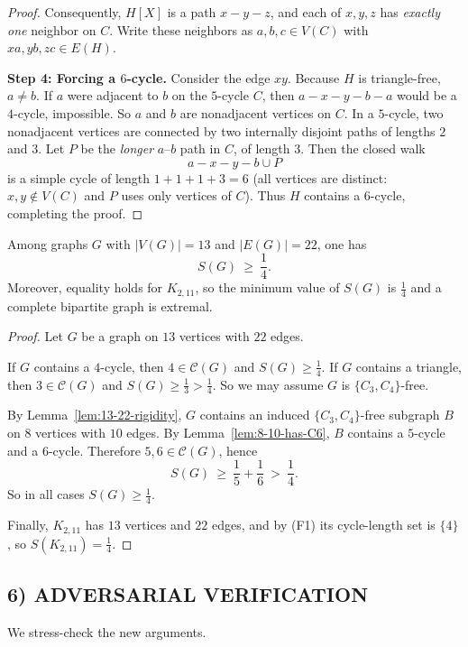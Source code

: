 \begin{proof}
Consequently, $H[X]$ is a path $x-y-z$, and each of $x,y,z$ has \emph{exactly one} neighbor on $C$.
Write these neighbors as $a,b,c\in V(C)$ with $xa, yb, zc\in E(H)$.

\medskip
\noindent\textbf{Step 4: Forcing a $6$-cycle.}
Consider the edge $xy$.
Because $H$ is triangle-free, $a\neq b$.
If $a$ were adjacent to $b$ on the $5$-cycle $C$, then $a-x-y-b-a$ would be a $4$-cycle, impossible.
So $a$ and $b$ are nonadjacent vertices on $C$.
In a $5$-cycle, two nonadjacent vertices are connected by two internally disjoint paths of lengths $2$ and $3$.
Let $P$ be the \emph{longer} $a$--$b$ path in $C$, of length $3$.
Then the closed walk
\[
a-x-y-b \cup P
\]
is a simple cycle of length $1+1+1+3=6$ (all vertices are distinct: $x,y\notin V(C)$ and $P$ uses only vertices of $C$).
Thus $H$ contains a $6$-cycle, completing the proof.
\end{proof}

\begin{theorem}[The case $(n,m)=(13,22)$]\label{thm:13-22}
Among graphs $G$ with $|V(G)|=13$ and $|E(G)|=22$, one has
\[
S(G)\ \ge\ \frac14.
\]
Moreover, equality holds for $K_{2,11}$, so the minimum value of $S(G)$ is $\frac14$ and a complete bipartite graph is extremal.
\end{theorem}

\begin{proof}
Let $G$ be a graph on $13$ vertices with $22$ edges.

If $G$ contains a $4$-cycle, then $4\in\mathcal C(G)$ and $S(G)\ge \frac14$.
If $G$ contains a triangle, then $3\in\mathcal C(G)$ and $S(G)\ge \frac13>\frac14$.
So we may assume $G$ is $\{C_3,C_4\}$-free.

By Lemma~\ref{lem:13-22-rigidity}, $G$ contains an induced $\{C_3,C_4\}$-free subgraph $B$ on $8$ vertices with $10$ edges.
By Lemma~\ref{lem:8-10-has-C6}, $B$ contains a $5$-cycle and a $6$-cycle.
Therefore $5,6\in\mathcal C(G)$, hence
\[
S(G)\ \ge\ \frac15+\frac16\ >\ \frac14.
\]
So in all cases $S(G)\ge \frac14$.

Finally, $K_{2,11}$ has $13$ vertices and $22$ edges, and by (F1) its cycle-length set is $\{4\}$, so $S(K_{2,11})=\frac14$.
\end{proof}

\subsection*{6) ADVERSARIAL VERIFICATION}
We stress-check the new arguments.

